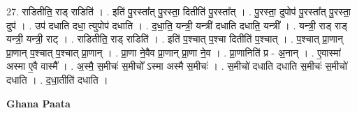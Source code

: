 \documentclass[17pt]{extarticle}
\begin{document}
27. राडितीति॒ राड् राडिति॑ । . इति॑ पु॒रस्ता᳚त् पु॒रस्ता॒ दितीति॑ पु॒रस्ता᳚त् । . पु॒रस्ता॒ दुपोप॑ पु॒रस्ता᳚त् पु॒रस्ता॒ दुप॑ । . उप॑ दधाति दधा॒ त्युपोप॑ दधाति । . द॒धा॒ति॒ यन्त्री॒ यन्त्री॑ दधाति दधाति॒ यन्त्री᳚ । . यन्त्री॒ राड् राड् यन्त्री॒ यन्त्री॒ राट् । . राडितीति॒ राड् राडिति॑ । . इति॑ प॒श्चात् प॒श्चा दितीति॑ प॒श्चात् । . प॒श्चात् प्रा॒णान् प्रा॒णान् प॒श्चात् प॒श्चात् प्रा॒णान् । . प्रा॒णा ने॒वैव प्रा॒णान् प्रा॒णा ने॒व । . प्रा॒णानिति॑ प्र - अ॒नान् । . ए॒वास्मा॑ अस्मा ए॒वै वास्मै᳚ । . अ॒स्मै॒ स॒मीचः॑ स॒मीचो᳚ ऽस्मा अस्मै स॒मीचः॑ । . स॒मीचो॑ दधाति दधाति स॒मीचः॑ स॒मीचो॑ दधाति । . द॒धा॒तीति॑ दधाति । \newline

\textbf{Ghana Paata } \newline
\end{document}
